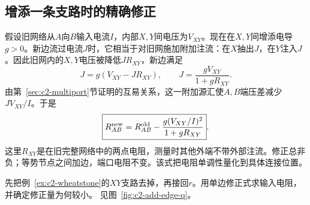 \subsection{增添一条支路时的精确修正}
假设旧网络从$A$向$B$输入电流$I$，内部$X,Y$间电压为$V_{XY}$。现在在$X,Y$间增添电导$g>0$。新边流过电流$J$时，它相当于对旧网施加附加注流：在$X$抽出$J$，在$Y$注入$J$。因此旧网内的$X,Y$电压被降低$JR_{XY}$，新边满足
\[
 J=g(V_{XY}-JR_{XY}),\qquad
 J=\frac{gV_{XY}}{1+gR_{XY}}.
\]
由第~\ref{sec:c2-multiport}节证明的互易关系，这一附加源汇使$A,B$端压差减少$J V_{XY}/I$。于是
\[
 \boxed{R_{AB}^{\rm new}=R_{AB}^{\rm old}
 -\frac{g(V_{XY}/I)^2}{1+gR_{XY}}}.
\]
这里$R_{XY}$是在旧完整网络中的两点电阻，测量时其他外端不带外部注流。修正总非负；等势节点之间加边，端口电阻不变。该式把电阻单调性量化到具体连接位置。

\begin{example}[从开桥状态预测接桥后的电阻]\label{ex:c2-add-edge}
先把例~\ref{ex:c2-wheatstone}的$XY$支路去掉，再接回$r$。用单边修正式求输入电阻，并确定修正量为何较小。 见图~\ref{fig:c2-add-edge-q}。
\end{example}

